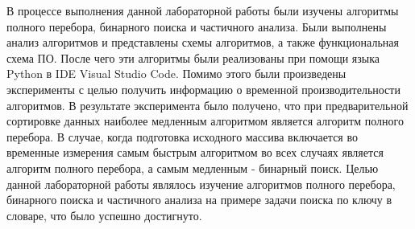 \Conclusion
В процессе выполнения данной лабораторной работы были изучены алгоритмы полного перебора, бинарного поиска и частичного анализа. Были выполнены анализ алгоритмов и представлены схемы алгоритмов, а также функциональная схема ПО. После чего эти алгоритмы были реализованы при помощи языка Python в IDE Visual Studio Code. Помимо этого были произведены эксперименты с целью получить информацию о временной производительности алгоритмов. В результате эксперимента было получено, что при предварительной сортировке данных наиболее медленным алгоритмом является алгоритм полного перебора. В случае, когда подготовка исходного массива включается во временные измерения самым быстрым алгоритмом во всех случаях является алгоритм полного перебора, а самым медленным - бинарный поиск.  Целью данной лабораторной работы являлось изучение алгоритмов  полного перебора, бинарного поиска и частичного анализа на примере задачи поиска по ключу в словаре, что было успешно достигнуто.
